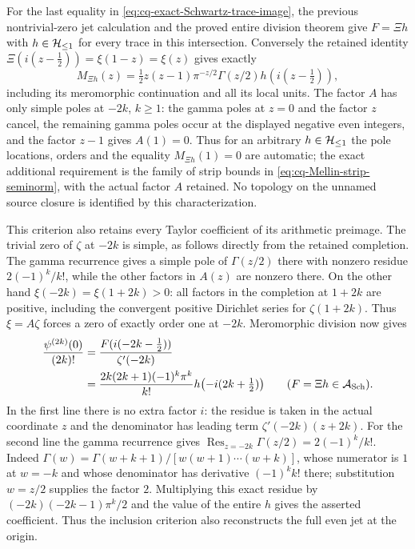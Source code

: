 For the last equality in
\eqref{eq:cq-exact-Schwartz-trace-image}, the previous
nontrivial-zero jet calculation and the proved entire division
theorem give $F=\Xi h$ with $h\in\mathcal H_{\leq 1}$ for every trace in
this intersection. Conversely the retained identity
$\Xi(i(z-\tfrac12))=\xi(1-z)=\xi(z)$ gives exactly
\[
 M_{\Xi h}(z)=
      \tfrac12z(z-1)\pi^{-z/2}\Gamma(z/2)
                      h(i(z-\tfrac12)),
\]
including its meromorphic continuation and all its local units.
The factor $A$ has only simple poles at $-2k$, $k\geq1$:
the gamma poles at $z=0$ and the factor $z$ cancel, the
remaining gamma poles occur at the displayed negative even
integers, and the factor $z-1$ gives $A(1)=0$.
Thus for an arbitrary $h\in\mathcal H_{\leq 1}$ the pole locations,
orders and the equality $M_{\Xi h}(1)=0$ are automatic;
the exact additional requirement is the family of strip bounds
in \eqref{eq:cq-Mellin-strip-seminorm}, with the actual factor
$A$ retained. No topology on the unnamed source closure is
identified by this characterization.

This criterion also retains every Taylor coefficient of its
arithmetic preimage. The trivial zero of $\zeta$ at $-2k$ is
simple, as follows directly from the retained completion.
The gamma recurrence gives a simple pole of $\Gamma(z/2)$
there with nonzero residue $2(-1)^k/k!$, while the other factors
in $A(z)$ are nonzero there. On the other hand
$\xi(-2k)=\xi(1+2k)>0$: all factors in the completion at $1+2k$
are positive, including the convergent positive Dirichlet series
for $\zeta(1+2k)$. Thus $\xi=A\zeta$ forces a zero of exactly
order one at $-2k$. Meromorphic division now gives
\begin{equation}\label{eq:cq-Schwartz-arithmetic-Taylor-data}
 \begin{aligned}
 \frac{\psi^{(2k)}(0)}{(2k)!}
 &=\frac{F(i(-2k-\tfrac12))}{\zeta'(-2k)}\\
 &=\frac{2k(2k+1)(-1)^k\pi^k}{k!}
                     h\bigl(-i(2k+\tfrac12)\bigr)
 \qquad(F=\Xi h\in\mathcal A_{\rm Sch}).
 \end{aligned}
\end{equation}
In the first line there is no extra factor $i$: the residue is
taken in the actual coordinate $z$ and the denominator has leading
term $\zeta'(-2k)(z+2k)$. For the second line the gamma
recurrence gives
$\operatorname*{Res}_{z=-2k}\Gamma(z/2)=2(-1)^k/k!$.
Indeed $\Gamma(w)=\Gamma(w+k+1)/
[w(w+1)\cdots(w+k)]$, whose numerator is $1$ at $w=-k$
and whose denominator has derivative $(-1)^kk!$ there;
substitution $w=z/2$ supplies the factor $2$. Multiplying
this exact residue by
$(-2k)(-2k-1)\pi^k/2$ and the value of the entire $h$
gives the asserted coefficient. Thus the inclusion criterion
also reconstructs the full even jet at the origin.

